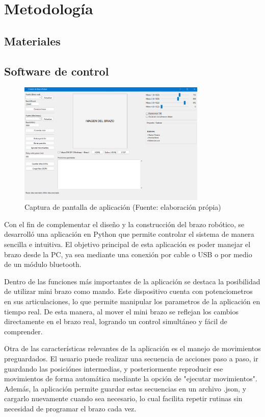 \section{Metodología}
\subsection{Materiales}
\subsection{Software de control}

\begin{figure}[H]
  \centering
  \includegraphics[width=0.8\textwidth]{anexos/software/ventanaApp.png}
  \caption{Captura de pantalla de aplicación (Fuente: elaboración própia)}\label{fig:captura.ventanaApp}
\end{figure}

Con el fin de complementar el diseño y la construcción del brazo robótico, se desarrolló una aplicación en Python que permite controlar el sistema de manera sencilla e intuitiva. El objetivo principal de esta aplicación es poder manejar el brazo desde la PC, ya sea mediante una conexión por cable o USB o por medio de un módulo bluetooth.

Dentro de las funciones más importantes de la aplicación se destaca la posibilidad de utilizar mini brazo como mando. Este dispositivo cuenta con potenciometros en sus articulaciones, lo que permite manipular los parametros de la aplicación en tiempo real. De esta manera, al mover el mini brazo se reflejan los cambios directamente en el brazo real, logrando un control simultáneo y fácil de comprender.

Otra de las características relevantes de la aplicación es el manejo de movimientos preguardados. El usuario puede realizar una secuencia de acciones paso a paso, ir guardando las posiciónes intermedias, y posteriormente reproducir ese movimientos de forma automática mediante la opción de "ejecutar movimientos". Además, la aplicación permite guardar estas secuencias en un archivo .json, y cargarlo nuevamente cuando sea necesario, lo cual facilita repetir rutinas sin necesidad de programar el brazo cada vez.

